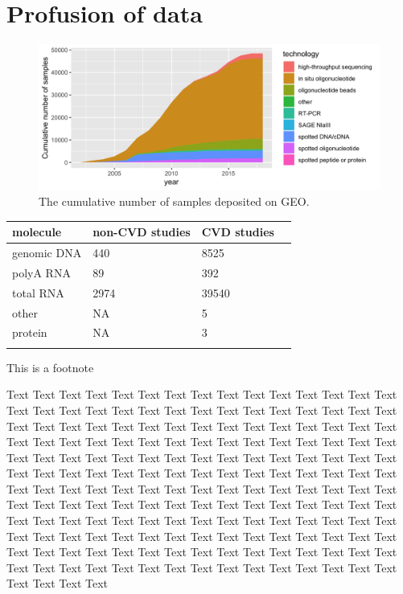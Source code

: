 \documentclass{bioinfo}
\begin{document}
\section{Profusion of data}

\begin{figure}[!tpb]%
\includegraphics[width=1\linewidth]{gsm_count_by_tech.png}
	\caption{The cumulative number of samples deposited on GEO.}\label{fig:01}
\end{figure}

\begin{table}[!t]
	 {\begin{tabular}{@{}llll@{}}\toprule 
			molecule &non-CVD studies & CVD studies \\ \midrule
			genomic DNA &            440 &        8525  \\
			polyA RNA &             89 &         392  \\
			total RNA &           2974 &       39540  \\
			other &             NA &           5  \\
			protein &             NA &           3  \\ \botrule
	\end{tabular}}{This is a footnote}
\end{table}

Text Text Text Text Text Text  Text Text Text Text Text Text Text Text  Text Text Text Text Text Text Text Text  Text Text Text Text Text Text Text Text  Text Text Text Text Text Text Text Text  Text Text Text Text Text Text Text Text  Text Text Text Text Text Text Text Text  Text Text Text Text Text Text Text Text  Text Text Text Text Text Text Text Text  Text Text Text Text Text Text Text Text  Text Text Text Text Text Text Text Text  Text Text Text Text Text Text Text Text  Text Text Text Text Text Text Text Text  Text Text Text Text Text Text Text Text  Text Text Text Text Text Text Text Text  Text Text Text Text Text Text Text Text  Text Text Text Text Text Text Text Text  Text Text Text Text Text Text Text Text  Text Text Text Text Text Text Text Text  Text Text Text Text Text Text Text Text  Text Text Text Text Text Text Text Text  Text Text Text Text Text Text Text Text  Text Text Text Text Text Text Text Text  Text Text 
%
\end{document}
